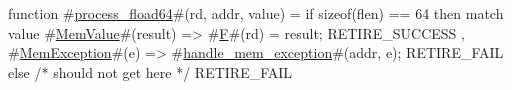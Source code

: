 function #\hyperref[sailRISCVzprocesszyfload64]{process\_fload64}#(rd, addr, value) =
  if   sizeof(flen) == 64
  then match value {
         #\hyperref[sailRISCVzMemValue]{MemValue}#(result) => { #\hyperref[sailRISCVzF]{F}#(rd) = result; RETIRE_SUCCESS },
         #\hyperref[sailRISCVzMemException]{MemException}#(e)  => { #\hyperref[sailRISCVzhandlezymemzyexception]{handle\_mem\_exception}#(addr, e); RETIRE_FAIL }
       }
  else {
    /* should not get here */
    RETIRE_FAIL
  }
